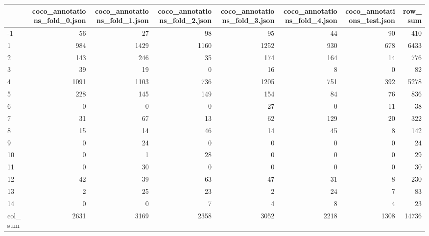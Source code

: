 \begin{tabular}{lrrrrrrr}
\toprule
 & coco_annotations_fold_0.json & coco_annotations_fold_1.json & coco_annotations_fold_2.json & coco_annotations_fold_3.json & coco_annotations_fold_4.json & coco_annotations_test.json & row_sum \\
\midrule
-1 & 56 & 27 & 98 & 95 & 44 & 90 & 410 \\
1 & 984 & 1429 & 1160 & 1252 & 930 & 678 & 6433 \\
2 & 143 & 246 & 35 & 174 & 164 & 14 & 776 \\
3 & 39 & 19 & 0 & 16 & 8 & 0 & 82 \\
4 & 1091 & 1103 & 736 & 1205 & 751 & 392 & 5278 \\
5 & 228 & 145 & 149 & 154 & 84 & 76 & 836 \\
6 & 0 & 0 & 0 & 27 & 0 & 11 & 38 \\
7 & 31 & 67 & 13 & 62 & 129 & 20 & 322 \\
8 & 15 & 14 & 46 & 14 & 45 & 8 & 142 \\
9 & 0 & 24 & 0 & 0 & 0 & 0 & 24 \\
10 & 0 & 1 & 28 & 0 & 0 & 0 & 29 \\
11 & 0 & 30 & 0 & 0 & 0 & 0 & 30 \\
12 & 42 & 39 & 63 & 47 & 31 & 8 & 230 \\
13 & 2 & 25 & 23 & 2 & 24 & 7 & 83 \\
14 & 0 & 0 & 7 & 4 & 8 & 4 & 23 \\
col_sum & 2631 & 3169 & 2358 & 3052 & 2218 & 1308 & 14736 \\
\bottomrule
\end{tabular}
